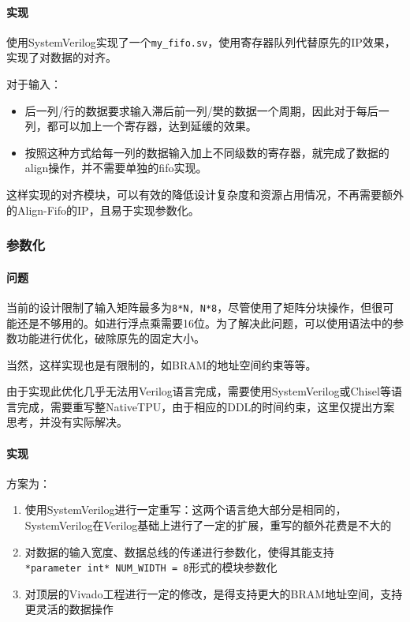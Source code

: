 \documentclass[12pt,a4paper]{article}
\begin{document}
\paragraph{实现}

使用SystemVerilog实现了一个\texttt{my\_fifo.sv}，使用寄存器队列代替原先的IP效果，实现了对数据的对齐。

对于输入：

\begin{itemize}
\item
  后一列/行的数据要求输入滞后前一列/樊的数据一个周期，因此对于每后一列，都可以加上一个寄存器，达到延缓的效果。
\item
  按照这种方式给每一列的数据输入加上不同级数的寄存器，就完成了数据的align操作，并不需要单独的fifo实现。
\end{itemize}

这样实现的对齐模块，可以有效的降低设计复杂度和资源占用情况，不再需要额外的Align-Fifo的IP，且易于实现参数化。

\subsubsection{参数化}

\paragraph{问题}

当前的设计限制了输入矩阵最多为\texttt{8*N,\ N*8}，尽管使用了矩阵分块操作，但很可能还是不够用的。如进行浮点乘需要16位。为了解决此问题，可以使用语法中的参数功能进行优化，破除原先的固定大小。

当然，这样实现也是有限制的，如BRAM的地址空间约束等等。

由于实现此优化几乎无法用Verilog语言完成，需要使用SystemVerilog或Chisel等语言完成，需要重写整NativeTPU，由于相应的DDL的时间约束，这里仅提出方案思考，并没有实际解决。

\paragraph{实现}

方案为：

\begin{enumerate}
\item
  使用SystemVerilog进行一定重写：这两个语言绝大部分是相同的，SystemVerilog在Verilog基础上进行了一定的扩展，重写的额外花费是不大的
\item
  对数据的输入宽度、数据总线的传递进行参数化，使得其能支持\texttt{*parameter\ int*\ NUM\_WIDTH\ =\ 8}形式的模块参数化
\item
  对顶层的Vivado工程进行一定的修改，是得支持更大的BRAM地址空间，支持更灵活的数据操作
\end{enumerate}
\end{document}
